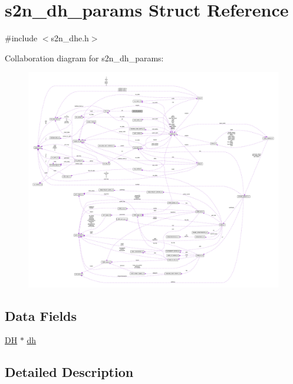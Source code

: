 \hypertarget{structs2n__dh__params}{}\section{s2n\+\_\+dh\+\_\+params Struct Reference}
\label{structs2n__dh__params}


{\ttfamily \#include $<$s2n\+\_\+dhe.\+h$>$}



Collaboration diagram for s2n\+\_\+dh\+\_\+params\+:\nopagebreak
\begin{figure}[H]
\begin{center}
\leavevmode
\includegraphics[width=350pt]{structs2n__dh__params__coll__graph}
\end{center}
\end{figure}
\subsection*{Data Fields}
\begin{DoxyCompactItemize}
\item 
\hyperlink{crypto_2ossl__typ_8h_a5a5072cfe75a51d0ff201c0a8d2d68b2}{DH} $\ast$ \hyperlink{structs2n__dh__params_a29d3a6b30f8ddddfe73007d3611b3de8}{dh}
\end{DoxyCompactItemize}


\subsection{Detailed Description}


